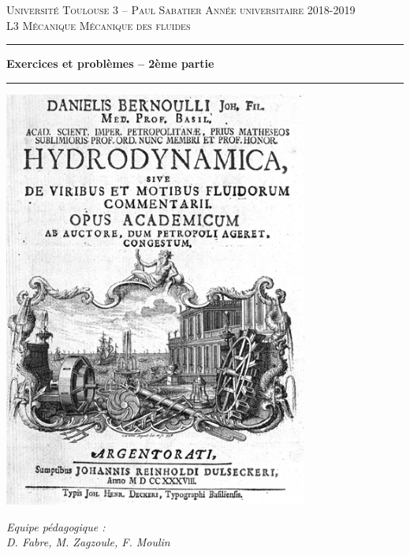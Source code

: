 \documentclass[10pt, a4paper]{article}
\begin{document}
                                          

\begin{titlepage}

\noindent
\textsc{Universit\'e Toulouse 3 -- Paul Sabatier \hfill Ann\'ee universitaire 2018-2019}
\\
\textsc{L3 M\'ecanique \hfill M\'ecanique des fluides}

\vspace{1cm}

\begin{center}
  \setlength{\unitlength}{1mm}
  \hrule height 1mm
  \vspace{6mm}
  \textbf{\LARGE Exercices et probl\`emes -- 2ème partie}
  \\ \vspace{5mm}
  \hrule height 1mm
  \vspace{2cm}
  \includegraphics[width=10cm]{bernoulli}
\end{center}

\vfill

\begin{flushright}
  \large{\textsl{Equipe p\'edagogique : \\
      D. Fabre, M. Zagzoule, F. Moulin}}
\end{flushright}

\end{titlepage}

\setcounter{secnumdepth}{2}
\tableofcontents








%
\end{document}

